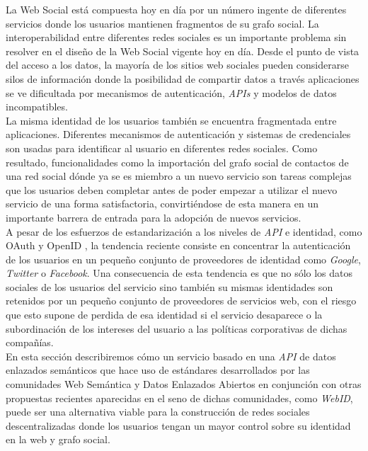 La Web Social est\'a compuesta hoy en d\'ia por un n\'umero ingente de diferentes servicios donde los usuarios mantienen fragmentos de su grafo social. La interoperabilidad entre diferentes redes sociales es un importante problema sin resolver en el dise\~no de la Web Social vigente hoy en d\'ia. Desde el punto de vista del acceso a los datos, la mayor\'ia de los sitios web sociales pueden considerarse silos de informaci\'on \cite{halpin2008beyond} donde la posibilidad de compartir datos a trav\'es aplicaciones se ve dificultada por mecanismos de autenticaci\'on, \textit{APIs}  y modelos de datos incompatibles.\\
La misma identidad de los usuarios tambi\'en se encuentra fragmentada entre aplicaciones. Diferentes mecanismos de autenticaci\'on y sistemas de credenciales son usadas para identificar al usuario en diferentes redes sociales. Como resultado, funcionalidades como la importaci\'on del grafo social de contactos de una red social d\'onde ya se es miembro a un nuevo servicio son tareas complejas que los usuarios deben completar antes de poder empezar a utilizar el nuevo servicio de una forma satisfactoria, convirti\'endose de esta manera en un importante barrera de entrada para la adopci\'on de nuevos servicios.\\
A pesar de los esfuerzos de estandarizaci\'on a los niveles de \textit{API} e identidad, como OAuth \cite{hammer2010oauth} y OpenID \cite{openid}, la tendencia reciente consiste en concentrar la autenticaci\'on de los usuarios en un peque\~no conjunto de proveedores de identidad como \textit{Google}, \textit{Twitter} o \textit{Facebook}. Una consecuencia de esta tendencia es que no s\'olo los datos sociales de los usuarios del servicio sino tambi\'en su mismas identidades son retenidos por un peque\~no conjunto de proveedores de servicios web, con el riesgo que esto supone de perdida de esa identidad si el servicio desaparece o la subordinaci\'on de los intereses del usuario a las pol\'iticas corporativas de dichas compa\~n\'ias.\\
En esta secci\'on describiremos c\'omo un servicio basado en una \textit{API} de datos enlazados sem\'anticos que hace uso de est\'andares desarrollados por las comunidades Web Sem\'antica y Datos Enlazados Abiertos en conjunci\'on con otras propuestas recientes aparecidas en el seno de dichas comunidades, como \textit{WebID}, puede ser una alternativa viable para la construcci\'on de redes sociales descentralizadas donde los usuarios tengan un mayor control sobre su identidad en la web y grafo social.\\

